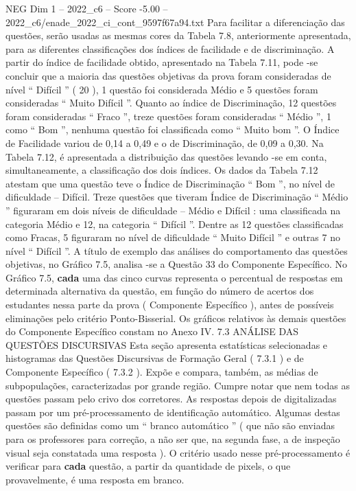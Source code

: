 \begin{textsample}{NEG Dim 1 – 2022\_c6 – Score -5.00 – 2022\_c6/enade\_2022\_ci\_cont\_9597f67a94.txt}
Para facilitar a diferenciação das questões, serão usadas as mesmas cores da Tabela 7.8, anteriormente apresentada, para as diferentes classificações dos índices de facilidade e de discriminação.
A partir do índice de facilidade obtido, apresentado na Tabela 7.11, pode -se concluir que a maioria das questões objetivas da prova foram consideradas de nível “ Difícil ” ( 20 ), 1 questão foi considerada Médio e 5 questões foram consideradas “ Muito Difícil ”.
Quanto ao índice de Discriminação, 12 questões foram consideradas “ Fraco ”, treze questões foram consideradas “ Médio ”, 1 como “ Bom ”, nenhuma questão foi classificada como “ Muito bom ”.
O Índice de Facilidade variou de 0,14 a 0,49 e o de Discriminação, de 0,09 a 0,30.
Na Tabela 7.12, é apresentada a distribuição das questões levando -se em conta, simultaneamente, a classificação dos dois índices.
Os dados da Tabela 7.12 atestam que uma questão teve o Índice de Discriminação “ Bom ”, no nível de dificuldade – Difícil.
Treze questões que tiveram Índice de Discriminação “ Médio ” figuraram em dois níveis de dificuldade – Médio e Difícil : uma classificada na categoria Médio e 12, na categoria “ Difícil ”.
Dentre as 12 questões classificadas como Fracas, 5 figuraram no nível de dificuldade “ Muito Difícil ” e outras 7 no nível “ Difícil ”.
A título de exemplo das análises do comportamento das questões objetivas, no Gráfico 7.5, analisa -se a Questão 33 do Componente Específico.
No Gráfico 7.5, \textbf{cada} uma das cinco curvas representa o percentual de respostas em determinada alternativa da questão, em função do número de acertos dos estudantes nessa parte da prova ( Componente Específico ), antes de possíveis eliminações pelo critério Ponto-Bisserial.
Os gráficos relativos às demais questões do Componente Específico constam no Anexo IV. 7.3 ANÁLISE DAS QUESTÕES DISCURSIVAS Esta seção apresenta estatísticas selecionadas e histogramas das Questões Discursivas de Formação Geral ( 7.3.1 ) e de Componente Específico ( 7.3.2 ).
Expõe e compara, também, as médias de subpopulações, caracterizadas por grande região.
Cumpre notar que nem todas as questões passam pelo crivo dos corretores.
As respostas depois de digitalizadas passam por um pré-processamento de identificação automático.
Algumas destas questões são definidas como um “ branco automático ” ( que não são enviadas para os professores para correção, a não ser que, na segunda fase, a de inspeção visual seja constatada uma resposta ).
O critério usado nesse pré-processamento é verificar para \textbf{cada} questão, a partir da quantidade de pixels, o que provavelmente, é uma resposta em branco.

\end{textsample}
